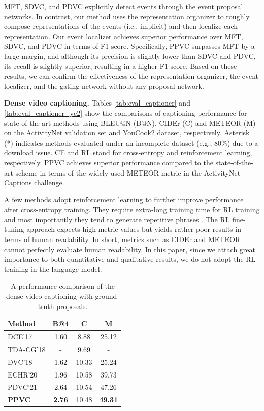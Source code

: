 MFT, SDVC, and PDVC explicitly detect events through the event proposal networks.
In contrast, our method uses the representation organizer to roughly compose representations of the events (i.e., implicit) and then localize each representation.
Our event localizer achieves superior performance over MFT, SDVC, and PDVC in terms of F1 score.
Specifically, PPVC surpasses MFT by a large margin, and although its precision is slightly lower than SDVC and PDVC, its recall is slightly superior, resulting in a higher F1 score.
Based on these results, we can confirm the effectiveness of the representation organizer, the event localizer, and the gating network without any proposal network.

\textbf{Dense video captioning.}
Tables \ref{tab:eval_captioner} and \ref{tab:eval_captioner_yc2} show the comparisons of captioning performance for state-of-the-art methods using BLEU@N (B@N), CIDEr (C) and METEOR (M) on the ActivityNet validation set and YouCook2 dataset, respectively.
Asterisk (*) indicates methods evaluated under an incomplete dataset (e.g., 80\%) due to a download issue.
CE and RL stand for cross-entropy and reinforcement learning, respectively.
PPVC achieves superior performance compared to the state-of-the-art scheme in terms of the widely used METEOR metric in the ActivityNet Captions challenge.

A few methods \cite{mun2019streamlined,deng2021sketch,wang2020event} adopt reinforcement learning to further improve performance after cross-entropy training.
They require extra-long training time for RL training and most importantly they tend to generate repetitive phrases \cite{wang2019describing}.
The RL fine-tuning approach expects high metric values but yields rather poor results in terms of human readability.
In short, metrics such as CIDEr and METEOR cannot perfectly evaluate human readability.
In this paper, since we attach great importance to both quantitative and qualitative results, we do not adopt the RL training in the language model.

\begin{table}[t]
  \centering
  \caption{
    A performance comparison of the dense video captioning with ground-truth proposals.
  }
  \begin{tabular}{l|c|c|c}
    \hline
    Method & B@4 & C & M \\
    \hline
    DCE'17 \cite{krishna2017dense} & 1.60 & 8.88 & 25.12 \\
    TDA-CG'18 \cite{wang2018bidirectional} & - & 9.69 & - \\
    DVC'18 \cite{li2018jointly} & 1.62 & 10.33 & 25.24 \\
    ECHR'20 \cite{wang2020event} & 1.96 & 10.58 & 39.73 \\
    PDVC'21 \cite{wang2021end} & 2.64 & 10.54 & 47.26 \\
    \textbf{PPVC} & \textbf{2.76} & 10.48 & \textbf{49.31} \\
    \hline
  \end{tabular}
  \label{tab:eval_captioning_gt}
\end{table}

